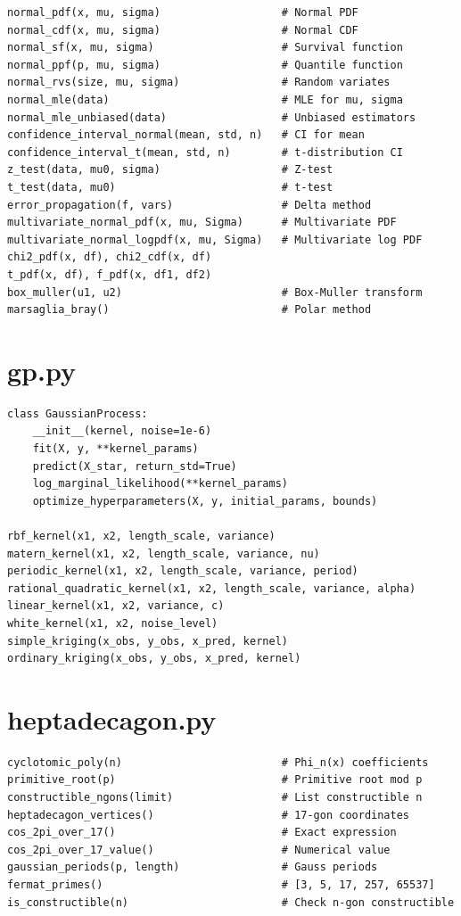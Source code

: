\begin{lstlisting}[style=python]
normal_pdf(x, mu, sigma)                   # Normal PDF
normal_cdf(x, mu, sigma)                   # Normal CDF
normal_sf(x, mu, sigma)                    # Survival function
normal_ppf(p, mu, sigma)                   # Quantile function
normal_rvs(size, mu, sigma)                # Random variates
normal_mle(data)                           # MLE for mu, sigma
normal_mle_unbiased(data)                  # Unbiased estimators
confidence_interval_normal(mean, std, n)   # CI for mean
confidence_interval_t(mean, std, n)        # t-distribution CI
z_test(data, mu0, sigma)                   # Z-test
t_test(data, mu0)                          # t-test
error_propagation(f, vars)                 # Delta method
multivariate_normal_pdf(x, mu, Sigma)      # Multivariate PDF
multivariate_normal_logpdf(x, mu, Sigma)   # Multivariate log PDF
chi2_pdf(x, df), chi2_cdf(x, df)
t_pdf(x, df), f_pdf(x, df1, df2)
box_muller(u1, u2)                         # Box-Muller transform
marsaglia_bray()                           # Polar method
\end{lstlisting}

\section{gp.py}

\begin{lstlisting}[style=python]
class GaussianProcess:
    __init__(kernel, noise=1e-6)
    fit(X, y, **kernel_params)
    predict(X_star, return_std=True)
    log_marginal_likelihood(**kernel_params)
    optimize_hyperparameters(X, y, initial_params, bounds)

rbf_kernel(x1, x2, length_scale, variance)
matern_kernel(x1, x2, length_scale, variance, nu)
periodic_kernel(x1, x2, length_scale, variance, period)
rational_quadratic_kernel(x1, x2, length_scale, variance, alpha)
linear_kernel(x1, x2, variance, c)
white_kernel(x1, x2, noise_level)
simple_kriging(x_obs, y_obs, x_pred, kernel)
ordinary_kriging(x_obs, y_obs, x_pred, kernel)
\end{lstlisting}

\section{heptadecagon.py}

\begin{lstlisting}[style=python]
cyclotomic_poly(n)                         # Phi_n(x) coefficients
primitive_root(p)                          # Primitive root mod p
constructible_ngons(limit)                 # List constructible n
heptadecagon_vertices()                    # 17-gon coordinates
cos_2pi_over_17()                          # Exact expression
cos_2pi_over_17_value()                    # Numerical value
gaussian_periods(p, length)                # Gauss periods
fermat_primes()                            # [3, 5, 17, 257, 65537]
is_constructible(n)                        # Check n-gon constructible
\end{lstlisting}

